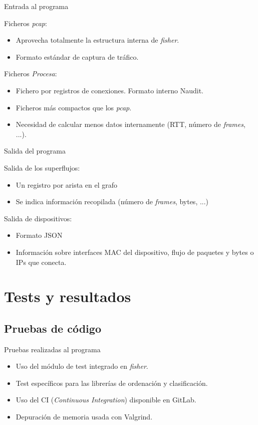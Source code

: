 \documentclass{beamer}
\begin{document}
\begin{frame}{Entrada al programa}

Ficheros \textit{pcap}:
\begin{itemize}
    \item Aprovecha totalmente la estructura interna de \textit{fisher}.
    \item Formato estándar de captura de tráfico.
\end{itemize}

Ficheros \textit{Procesa}:
\begin{itemize}
    \item Fichero por registros de conexiones. Formato interno Naudit.
    \item Ficheros más compactos que los \textit{pcap}.
    \item Necesidad de calcular menos datos internamente (RTT, número de \textit{frames}, ...).
\end{itemize}
    
\end{frame}

\begin{frame}{Salida del programa}

Salida de los superflujos:
\begin{itemize}
    \item Un registro por arista en el grafo
    \item Se indica información recopilada (número de \textit{frames}, bytes, ...)
\end{itemize}

Salida de dispositivos:
\begin{itemize}
    \item Formato JSON
    \item Información sobre interfaces MAC del dispositivo, flujo de paquetes y bytes o IPs que conecta.
\end{itemize}
    
\end{frame}

\section{Tests y resultados}
\subsection{Pruebas de código}
\begin{frame}{Pruebas realizadas al programa}
\begin{itemize}
    \item Uso del módulo de test integrado en \textit{fisher}.
    \item Test específicos para las librerías de ordenación y clasificación.
    \item Uso del CI (\textit{Continuous Integration}) disponible en GitLab.
    \item Depuración de memoria usada con Valgrind.
\end{itemize}
    
\end{frame}
\end{document}
